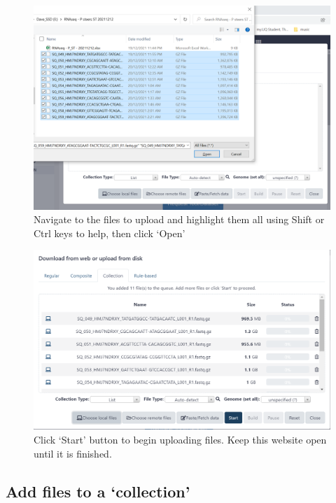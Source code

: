 \documentclass[
]{book}
\begin{document}
\begin{figure}

{\centering \includegraphics[width=1\linewidth]{images/image003} 

}

\caption{Navigate to the files to upload and highlight them all using Shift or Ctrl keys to help, then click ‘Open’}\label{fig:chunk3}
\end{figure}

\begin{figure}

{\centering \includegraphics[width=1\linewidth]{images/image004} 

}

\caption{Click ‘Start’ button to begin uploading files. Keep this website open until it is finished.}\label{fig:chunk4}
\end{figure}

\hypertarget{add-files-to-a-collection}{%
\subsection{Add files to a `collection'}\label{add-files-to-a-collection}}
\end{document}
